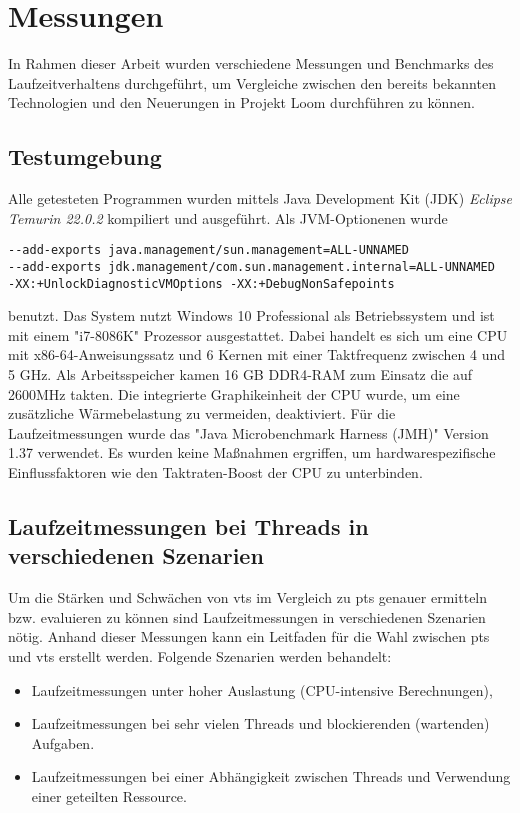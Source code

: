 \chapter{Messungen}
\label{cha:Messungen}
    In Rahmen dieser Arbeit wurden verschiedene Messungen und Benchmarks des Laufzeitverhaltens durchgeführt, um Vergleiche zwischen den bereits bekannten Technologien und den Neuerungen in Projekt Loom 
    durchführen zu können. 

\section{Testumgebung}                                         
\label{sec:Testumgebung}

    Alle getesteten Programmen wurden mittels Java Development Kit (JDK) \emph{Eclipse Temurin 22.0.2} kompiliert und ausgeführt. Als JVM-Optionenen wurde 
\begin{verbatim}
--add-exports java.management/sun.management=ALL-UNNAMED 
--add-exports jdk.management/com.sun.management.internal=ALL-UNNAMED 
-XX:+UnlockDiagnosticVMOptions -XX:+DebugNonSafepoints\end{verbatim}
    benutzt.
    Das System nutzt Windows 10 Professional als Betriebssystem und ist mit einem "i7-8086K" Prozessor ausgestattet. Dabei handelt es sich um eine CPU mit x86-64-Anweisungssatz und 6 
    Kernen mit einer Taktfrequenz zwischen 4 und 5 GHz. Als Arbeitsspeicher kamen  16 GB DDR4-RAM zum Einsatz die auf 2600MHz takten. Die integrierte Graphikeinheit der CPU wurde, 
    um eine zusätzliche Wärmebelastung zu vermeiden, deaktiviert. 
    Für die Laufzeitmessungen wurde das "Java Microbenchmark Harness (JMH)" Version 1.37 verwendet.
    Es wurden keine Maßnahmen ergriffen, um hardwarespezifische Einflussfaktoren wie den Taktraten-Boost der CPU zu unterbinden.


\section{Laufzeitmessungen bei Threads in verschiedenen Szenarien}                                         
\label{sec:LaufzeitmessungenbeiThreadsinverschiedenenSzenarien}

    Um die Stärken und Schwächen von \Glspl{vt} im Vergleich zu \Glspl{pt} genauer ermitteln bzw. evaluieren zu können sind Laufzeitmessungen in verschiedenen Szenarien nötig. 
    Anhand dieser Messungen kann ein Leitfaden für die Wahl zwischen \Glspl{pt} und \Glspl{vt} erstellt werden. 
    Folgende Szenarien werden behandelt:
    \begin{itemize}
        \item Laufzeitmessungen unter hoher Auslastung (CPU-intensive Berechnungen),  
        \item Laufzeitmessungen bei sehr vielen Threads und blockierenden (wartenden) Aufgaben.
        \item Laufzeitmessungen bei einer Abhängigkeit zwischen Threads und Verwendung einer geteilten Ressource.
    \end{itemize}


